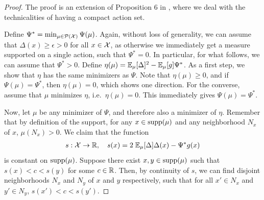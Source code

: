 \begin{proof} The proof is an extension of Proposition 6 in \citep{RussoLearningOptimizeInformationDirected2014}, where we deal with the technicalities of having a compact action set.
	
	Define $\Psi^* = \min_{\mu \in \mathcal{P}(\mathcal{X})} \Psi(\mu)$. Again, without loss of generality, we can assume that $\Delta(x) \geq \epsilon > 0$ for all $x\in \mathcal{X}$, as otherwise we immediately get a measure supported on a single action, such that $\Psi^* = 0$. In particular, for what follows, we can assume that $\Psi^* > 0$. Define $\eta(\mu) = \mathbb{E}_\mu[\Delta]^2  - \mathbb{E}_\mu[g]\Psi^*$. As a first step, we show that $\eta$ has the same minimizers as $\Psi$. 
	Note that $\eta(\mu) \geq 0$, and if $\Psi(\mu) = \Psi^*$, then $\eta(\mu) = 0$, which shows one direction. For the converse, assume that $\mu$ minimizes $\eta$, i.e.\ $\eta(\mu) = 0$. This immediately gives $\Psi(\mu) = \Psi^*$. 
	
	Now, let $\mu$ be any minimizer of $\Psi$, and therefore also a minimizer of $\eta$. Remember that by definition of the support, for any $x \in \text{supp}(\mu)$ and any neighborhood $N_x$ of $x$, $\mu(N_x) > 0$. We claim that the function 
	\begin{align*}
	s : \mathcal{X} \rightarrow \mathbb{R},\quad s(x) = 2\; \mathbb{E}_\mu[\Delta] \Delta(x)- \Psi^* g(x)
	\end{align*}
	is constant on $\text{supp}(\mu)$. Suppose there exist $x,y \in \text{supp}(\mu)$ such that $s(x) < c < s(y)$ for some $c \in \mathbb{R}$. Then, by continuity of $s$, we can find disjoint neighborhoods $N_x$ and $N_y$ of $x$ and $y$ respectively, such that for all $x' \in N_x$ and $y' \in N_y$, $s(x') < c < s(y')$. 


\end{proof}
